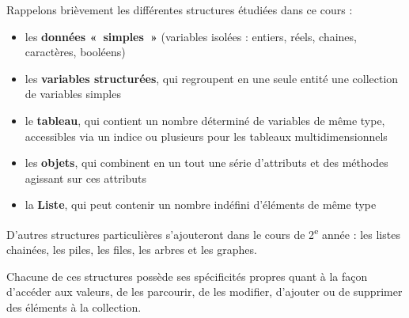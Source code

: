 Rappelons brièvement les différentes structures étudiées dans ce cours
 :

\begin{itemize}
	\item 
		les \textbf{données «~simples~»} (variables isolées : entiers, réels,
		chaines, caractères, booléens)
	\item 
		les \textbf{variables structurées}, qui regroupent en une seule entité
		une collection de variables simples
	\item 
		le \textbf{tableau}, qui contient un nombre déterminé de variables de
		même type, accessibles via un indice ou plusieurs pour les tableaux
		multidimensionnels
	\item 
		les \textbf{objets}, qui combinent en un tout une série d’attributs et
		des méthodes agissant sur ces attributs
	\item 
		la \textbf{Liste}, qui peut contenir un nombre indéfini d’éléments de
		même type
\end{itemize}

D’autres structures particulières s’ajouteront dans le cours de
2\textsuperscript{e} année : les listes chainées, les piles, les
files, les arbres et les graphes.

Chacune de ces structures possède ses spécificités propres quant à la
façon d’accéder aux valeurs, de les parcourir, de les modifier,
d’ajouter ou de supprimer des éléments à la collection. 




